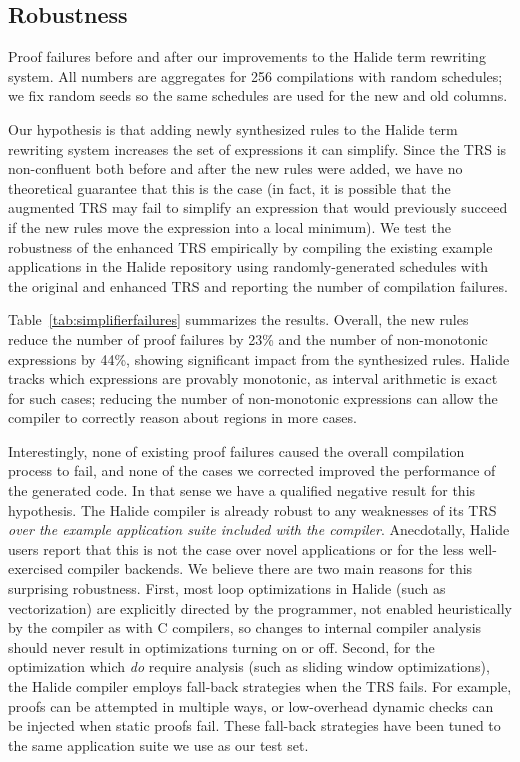 \documentclass[sigplan,10pt,review,anonymous]{acmart}\settopmatter{printfolios=true,printccs=false,printacmref=false}
\begin{document}
\subsection{Robustness}
\begin{table}[!ht]
  \caption{Proof failures before and after our improvements to the Halide term rewriting system.
    All numbers are aggregates for 256 compilations with random schedules; we fix random seeds so
    the same schedules are used for the new and old columns.}
  \label{tab:simplifierfailures}
  \small
  
\end{table}

Our hypothesis is that adding newly synthesized rules to the Halide
term rewriting system increases the set of expressions it can simplify. Since the
TRS is non-confluent both before and after the new rules were added, we
have no theoretical guarantee that this is the case (in fact, it is possible
that the augmented TRS may fail to simplify an expression that would
previously succeed if the new rules move the expression into a local
minimum). We test the robustness of the enhanced TRS empirically by
compiling the existing example applications in the Halide repository
using randomly-generated schedules with the original and enhanced TRS
and reporting the number of compilation failures.

Table~\ref{tab:simplifierfailures} summarizes the results.  Overall, the new rules
reduce the number of proof failures by 23\% and the number of non-monotonic expressions
by 44\%, showing significant impact from the synthesized rules.  Halide tracks
which expressions are provably monotonic, as interval arithmetic is exact for
such cases; reducing the number of non-monotonic expressions can allow the
compiler to correctly reason about regions in more cases.

Interestingly, none of existing proof failures caused the overall compilation process to fail, and none of the cases we corrected improved the performance of the generated code. In that sense we have a qualified negative result for this hypothesis. The Halide compiler is already robust to any weaknesses of its TRS \emph{over the example application suite included with the compiler}. Anecdotally, Halide users report that this is not the case over novel applications or for the less well-exercised compiler backends. We believe there are two main reasons for this surprising robustness. First, most loop optimizations in Halide (such as vectorization) are explicitly directed by the programmer, not enabled heuristically by the compiler as with C compilers, so changes to internal compiler analysis should never result in optimizations turning on or off. Second, for the optimization which \emph{do} require analysis (such as sliding window optimizations), the Halide compiler employs fall-back strategies when the TRS fails. For example, proofs can be attempted in multiple ways, or low-overhead dynamic checks can be injected when static proofs fail. These fall-back strategies have been tuned to the same application suite we use as our test set.
\end{document}
